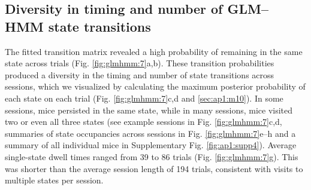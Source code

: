 \subsection{Diversity in timing and number of GLM–HMM state transitions}
\label{sec:glmhmm:2.2.9}

The fitted transition matrix revealed a high probability of remaining in the same state across trials (Fig. \ref{fig:glmhmm:7}a,b). These transition probabilities produced a diversity in the timing and number of state transitions across sessions, which we visualized by calculating the maximum posterior probability of each state on each trial (Fig. \ref{fig:glmhmm:7}c,d and \ref{sec:ap1:m10}). In some sessions, mice persisted in the same state, while in many sessions, mice visited two or even all three states (see example sessions in Fig. \ref{fig:glmhmm:7}c,d, summaries of state occupancies across sessions in Fig. \ref{fig:glmhmm:7}e–h and a summary of all individual mice in Supplementary Fig. \ref{fig:ap1:supp4}). Average single-state dwell times ranged from 39 to 86 trials (Fig. \ref{fig:glmhmm:7}g). This was shorter than the average session length of 194 trials, consistent with visits to multiple states per session.

